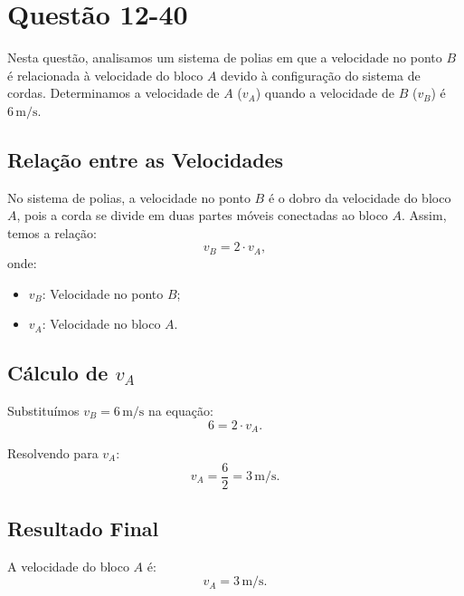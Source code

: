\section{Questão 12-40}

Nesta questão, analisamos um sistema de polias em que a velocidade no ponto \(B\) é relacionada à velocidade do bloco \(A\) devido à configuração do sistema de cordas. Determinamos a velocidade de \(A\) (\(v_A\)) quando a velocidade de \(B\) (\(v_B\)) é \(6 \, \text{m/s}\).

\subsection*{Relação entre as Velocidades}
No sistema de polias, a velocidade no ponto \(B\) é o dobro da velocidade do bloco \(A\), pois a corda se divide em duas partes móveis conectadas ao bloco \(A\). Assim, temos a relação:
\[
v_B = 2 \cdot v_A,
\]
onde:
\begin{itemize}
    \item \(v_B\): Velocidade no ponto \(B\);
    \item \(v_A\): Velocidade no bloco \(A\).
\end{itemize}

\subsection*{Cálculo de \(v_A\)}
Substituímos \(v_B = 6 \, \text{m/s}\) na equação:
\[
6 = 2 \cdot v_A.
\]

Resolvendo para \(v_A\):
\[
v_A = \frac{6}{2} = 3 \, \text{m/s}.
\]

\subsection*{Resultado Final}
A velocidade do bloco \(A\) é:
\[
v_A = 3 \, \text{m/s}.
\]
